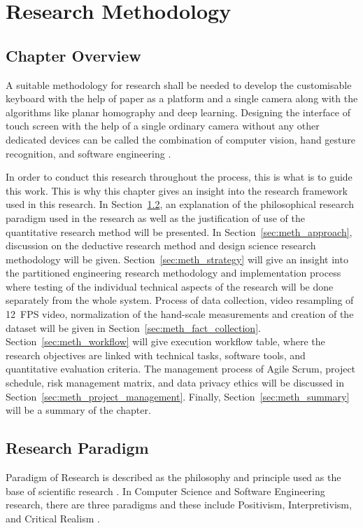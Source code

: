 \chapter{Research Methodology}
\label{ch:research_methodology}

\section{Chapter Overview}
\label{sec:meth_chapter_overview}
A suitable methodology for research shall be needed to develop the customisable keyboard with the help of paper as a platform and a single camera along with the algorithms like planar homography and deep learning. Designing the interface of touch screen with the help of a single ordinary camera without any other dedicated devices can be called the combination of computer vision, hand gesture recognition, and software engineering \cite{ReviewVirtualKeyboard2020, Maman2023TypeNet}.

In order to conduct this research throughout the process, this is what is to guide this work. This is why this chapter gives an insight into the research framework used in this research. In Section~\ref{sec:meth_paradigm}, an explanation of the philosophical research paradigm used in the research as well as the justification of use of the quantitative research method will be presented. In Section~\ref{sec:meth_approach}, discussion on the deductive research method and design science research methodology will be given. Section~\ref{sec:meth_strategy} will give an insight into the partitioned engineering research methodology and implementation process where testing of the individual technical aspects of the research will be done separately from the whole system. Process of data collection, video resampling of 12~FPS video, normalization of the hand-scale measurements and creation of the dataset will be given in Section~\ref{sec:meth_fact_collection}. Section~\ref{sec:meth_workflow} will give execution workflow table, where the research objectives are linked with technical tasks, software tools, and quantitative evaluation criteria. The management process of Agile Scrum, project schedule, risk management matrix, and data privacy ethics will be discussed in Section~\ref{sec:meth_project_management}. Finally, Section~\ref{sec:meth_summary} will be a summary of the chapter.

\section{Research Paradigm}
\label{sec:meth_paradigm}
Paradigm of Research is described as the philosophy and principle used as the base of scientific research \cite{Cui2020Deep}. In Computer Science and Software Engineering research, there are three paradigms and these include Positivism, Interpretivism, and Critical Realism \cite{ReviewVirtualKeyboard2020}.

